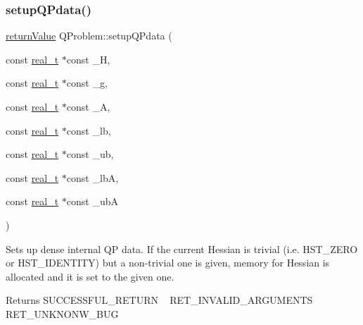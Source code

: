 \subsubsection{\texorpdfstring{setup\+Q\+Pdata()}{setupQPdata()}\hspace{0.1cm}{\footnotesize\ttfamily [2/2]}}
{\footnotesize\ttfamily \hyperlink{_message_handling_8hpp_a81d556f613bfbabd0b1f9488c0fa865e}{return\+Value} Q\+Problem\+::setup\+Q\+Pdata (\begin{DoxyParamCaption}\item[{const \hyperlink{qp_o_a_s_e_s__wrapper_8h_a0d00e2b3dfadee81331bbb39068570c4}{real\+\_\+t} $\ast$const}]{\+\_\+H,  }\item[{const \hyperlink{qp_o_a_s_e_s__wrapper_8h_a0d00e2b3dfadee81331bbb39068570c4}{real\+\_\+t} $\ast$const}]{\+\_\+g,  }\item[{const \hyperlink{qp_o_a_s_e_s__wrapper_8h_a0d00e2b3dfadee81331bbb39068570c4}{real\+\_\+t} $\ast$const}]{\+\_\+A,  }\item[{const \hyperlink{qp_o_a_s_e_s__wrapper_8h_a0d00e2b3dfadee81331bbb39068570c4}{real\+\_\+t} $\ast$const}]{\+\_\+lb,  }\item[{const \hyperlink{qp_o_a_s_e_s__wrapper_8h_a0d00e2b3dfadee81331bbb39068570c4}{real\+\_\+t} $\ast$const}]{\+\_\+ub,  }\item[{const \hyperlink{qp_o_a_s_e_s__wrapper_8h_a0d00e2b3dfadee81331bbb39068570c4}{real\+\_\+t} $\ast$const}]{\+\_\+lbA,  }\item[{const \hyperlink{qp_o_a_s_e_s__wrapper_8h_a0d00e2b3dfadee81331bbb39068570c4}{real\+\_\+t} $\ast$const}]{\+\_\+ubA }\end{DoxyParamCaption})\hspace{0.3cm}{\ttfamily [protected]}}

Sets up dense internal QP data. If the current Hessian is trivial (i.\+e. H\+S\+T\+\_\+\+Z\+E\+RO or H\+S\+T\+\_\+\+I\+D\+E\+N\+T\+I\+TY) but a non-\/trivial one is given, memory for Hessian is allocated and it is set to the given one. \begin{DoxyReturn}{Returns}
S\+U\+C\+C\+E\+S\+S\+F\+U\+L\+\_\+\+R\+E\+T\+U\+RN ~\newline
 R\+E\+T\+\_\+\+I\+N\+V\+A\+L\+I\+D\+\_\+\+A\+R\+G\+U\+M\+E\+N\+TS ~\newline
 R\+E\+T\+\_\+\+U\+N\+K\+N\+O\+N\+W\+\_\+\+B\+UG 
\end{DoxyReturn}

